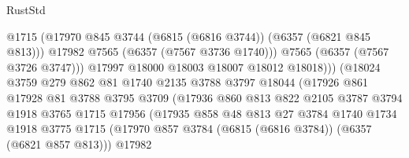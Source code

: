 \begin{lexlean}{RustStd}
\begin{coremodule}
                                      @1715
                                      (@17970
                                        @845
                                        @3744
                                        (@6815 (@6816 @3744))
                                        (@6357 (@6821 @845 @813)))
                                      @17982
                                      @7565
                                      (@6357 (@7567 @3736 @1740)))
                                    @7565
                                    (@6357 (@7567 @3726 @3747)))
                                  @17997
                                  @18000
                                  @18003
                                  @18007
                                  @18012
                                  @18018)))
                            (@18024
                              @3759
                              @279
                              @862
                              @81
                              @1740
                              @2135
                              @3788
                              @3797
                              @18044
                              (@17926
                                @861
                                @17928
                                @81
                                @3788
                                @3795
                                @3709
                                (@17936
                                  @860
                                  @813
                                  @822
                                  @2105
                                  @3787
                                  @3794
                                  @1918
                                  @3765
                                  @1715
                                  @17956
                                  (@17935
                                    @858
                                    @48
                                    @813
                                    @27
                                    @3784
                                    @1740
                                    @1734
                                    @1918
                                    @3775
                                    @1715
                                    (@17970
                                      @857
                                      @3784
                                      (@6815 (@6816 @3784))
                                      (@6357 (@6821 @857 @813)))
                                    @17982

\end{coremodule}
\end{lexlean}
